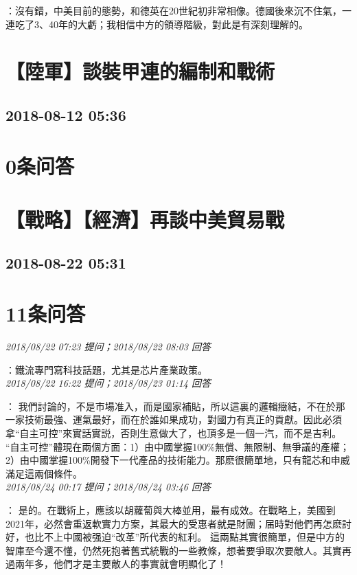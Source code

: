 \documentclass[twocolumn]{ctexart}
\begin{document}
：沒有錯，中美目前的態勢，和德英在20世紀初非常相像。德國後來沉不住氣，一連吃了3、40年的大虧；我相信中方的領導階級，對此是有深刻理解的。
\\


\section{【陸軍】談裝甲連的編制和戰術}
\subsection{2018-08-12 05:36}


\section{0条问答}


\section{【戰略】【經濟】再談中美貿易戰}
\subsection{2018-08-22 05:31}


\section{11条问答}

\textit{\hfill\noindent\small 2018/08/22 07:23 提问；2018/08/22 08:03 回答}

：鐵流專門寫科技話題，尤其是芯片產業政策。
\\

\textit{\hfill\noindent\small 2018/08/22 16:22 提问；2018/08/23 01:14 回答}

：
我們討論的，不是市場准入，而是國家補貼，所以這裏的邏輯癥結，不在於那一家技術最強、運氣最好，而在於誰如果成功，對國力有真正的貢獻。因此必須拿“自主可控”來實話實説，否則生意做大了，也頂多是一個一汽，而不是吉利。
“自主可控”體現在兩個方面：1）由中國掌握100\%無償、無限制、無爭議的產權；2）由中國掌握100\%開發下一代產品的技術能力。那麽很簡單地，只有龍芯和申威滿足這兩個條件。
\\

\textit{\hfill\noindent\small 2018/08/24 00:17 提问；2018/08/24 03:46 回答}

：
是的。在戰術上，應該以胡蘿蔔與大棒並用，最有成效。在戰略上，美國到2021年，必然會重返軟實力方案，其最大的受惠者就是財團；届時對他們再怎麽討好，也比不上中國被强迫“改革”所代表的紅利。
這兩點其實很簡單，但是中方的智庫至今還不懂，仍然死抱著舊式統戰的一些教條，想著要爭取次要敵人。其實再過兩年多，他們才是主要敵人的事實就會明顯化了！
\\
\end{document}
